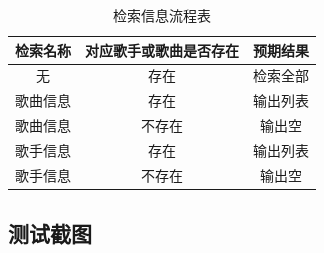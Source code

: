 \documentclass[UTF8,14pt]{article}
\numberwithin{figure}{subsubsection}
\numberwithin{table}{subsubsection}
\begin{document}
\begin{table}[H]
	\centering
	\begin{tabular}{ccc}
		\hline
		\multicolumn{1}{c}{检索名称} & \multicolumn{1}{c}{对应歌手或歌曲是否存在} & \multicolumn{1}{c}{预期结果} \\ \hline
		无                           & 存在                                       & 检索全部                     \\
		歌曲信息                     & 存在                                       & 输出列表                     \\
		歌曲信息                     & 不存在                                     & 输出空                       \\
		歌手信息                     & 存在                                       & 输出列表                     \\
		歌手信息                     & 不存在                                     & 输出空                       \\\hline
	\end{tabular}
	\caption{检索信息流程表}
\end{table}
\subsection{测试截图}
\end{document}
